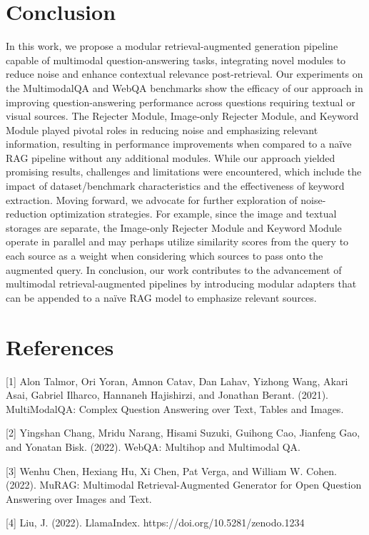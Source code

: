 \documentclass[twocolumn]{article}
\begin{document}
\section{Conclusion}
In this work, we propose a modular retrieval-augmented generation pipeline capable of multimodal question-answering tasks, integrating novel modules to reduce noise and enhance contextual relevance post-retrieval. Our experiments on the MultimodalQA and WebQA benchmarks show the efficacy of our approach in improving question-answering performance across questions requiring textual or visual sources. The Rejecter Module, Image-only Rejecter Module, and Keyword Module played pivotal roles in reducing noise and emphasizing relevant information, resulting in performance improvements when compared to a naïve RAG pipeline without any additional modules. While our approach yielded promising results, challenges and limitations were encountered, which include the impact of dataset/benchmark characteristics and the effectiveness of keyword extraction. Moving forward, we advocate for further exploration of noise-reduction optimization strategies. For example, since the image and textual storages are separate, the Image-only Rejecter Module and Keyword Module operate in parallel and may perhaps utilize similarity scores from the query to each source as a weight when considering which sources to pass onto the augmented query. In conclusion, our work contributes to the advancement of multimodal retrieval-augmented pipelines by introducing modular adapters that can be appended to a naïve RAG model to emphasize relevant sources.

\section{References}
[1]	Alon Talmor, Ori Yoran, Amnon Catav, Dan Lahav, Yizhong Wang, Akari Asai, Gabriel Ilharco, Hannaneh Hajishirzi, and Jonathan Berant. (2021). MultiModalQA: Complex Question Answering over Text, Tables and Images.

[2]	Yingshan Chang, Mridu Narang, Hisami Suzuki, Guihong Cao, Jianfeng Gao, and Yonatan Bisk. (2022). WebQA: Multihop and Multimodal QA.

[3]	Wenhu Chen, Hexiang Hu, Xi Chen, Pat Verga, and William W. Cohen. (2022). MuRAG: Multimodal Retrieval-Augmented Generator for Open Question Answering over Images and Text.

[4]	Liu, J. (2022). LlamaIndex. https://doi.org/10.5281/zenodo.1234
\end{document}
